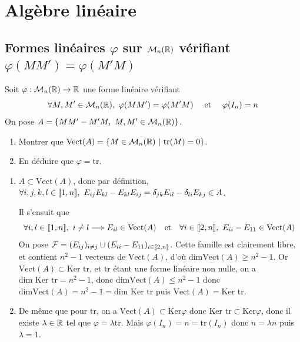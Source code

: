 %
%

\newpage
\section[Algèbre linéaire]{Algèbre linéaire}

\subsection{Formes linéaires $\varphi$ sur $\mathcal M_n(\mathbb{R})$ vérifiant $\varphi(MM')=\varphi(M'M)$}
\begin{exo}
Soit $\varphi : \mathcal M_n(\mathbb{R})\to \mathbb{R}$ une forme linéaire vérifiant
\[\forall M,M'\in \mathcal M_n(\R),\ \varphi(MM')=\varphi(M'M)\quad \text{ et }\quad \varphi(I_n)=n\]
On pose $A=\lbrace MM'-M'M,\ M,M'\in \mathcal M_n(\mathbb{R})\rbrace$. 
\begin{enumerate}
	\item Montrer que $\text{Vect}(A)=\lbrace M\in \mathcal M_n(\mathbb{R})\ |\ \text{tr}(M)=0\rbrace$.
	\item En déduire que $\varphi=\text{tr}$.
\end{enumerate}
\end{exo}
\begin{sol}
\begin{enumerate}
	\item $A\subset \text{Vect}(A)$, donc par définition, $\forall i,j,k,l\in\inl{1}{n},\ E_{ij}E_{kl}-E_{kl}E_{ij}=\delta_{jk}E_{il}-\delta_{li}E_{kj}\in A$. 

	Il s'ensuit que
	\[\forall i,l\in\inl1n,\ i\neq l\implique E_{il}\in \text{Vect}(A)\quad \text{et}\quad \forall i\in\inl{2}{n},\ E_{ii}-E_{11}\in \text{Vect}(A)\]
	On pose $\mathcal F=(E_{ij})_{i\neq j}\cup(E_{ii}-E_{11})_{i\in[\![2,n]\!]}$. Cette famille est clairement libre, et contient $n^2-1$ vecteurs de $\text{Vect}(A)$, d'où $\text{dim}\text{Vect}(A)\geq n^2-1$. Or $\text{Vect}(A)\subset \text{Ker tr}$, et $\text{tr}$ étant une forme linéaire non nulle, on a $\text{dim } \text{Ker tr}=n^2-1$, donc $\text{dim} \text{Vect}(A)\leq n^2-1$ donc $\text{dim} \text{Vect}(A)=n^2-1=\text{dim}\text{ Ker tr}$ puis $\text{Vect}(A)=\text{Ker tr}$.
	\item De même que pour $\text{tr}$, on a $\text{Vect}(A)\subset \text{Ker}\varphi$ donc $\text{Ker tr}\subset \text{Ker}\varphi$, donc il existe $\lambda\in\mathbb{R}$ tel que $\varphi=\lambda\text{tr}$. Mais $\varphi(I_n)=n=\text{tr}(I_n)$ donc $n=\lambda n$ puis $\lambda = 1$.
\end{enumerate}
\end{sol}


